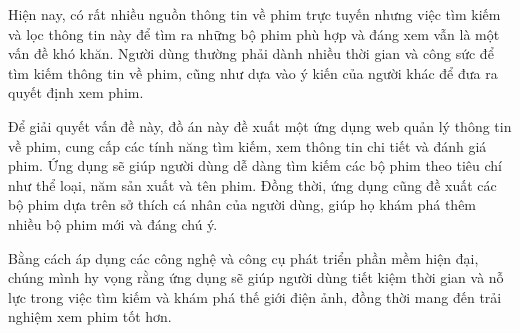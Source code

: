 \documentclass[12pt]{article}
\begin{document}
Hiện nay, có rất nhiều nguồn thông tin về phim trực tuyến nhưng việc tìm kiếm và lọc thông tin này để tìm ra những bộ phim phù hợp và đáng xem vẫn là một vấn đề khó khăn. Người dùng thường phải dành nhiều thời gian và công sức để tìm kiếm thông tin về phim, cũng như dựa vào ý kiến của người khác để đưa ra quyết định xem phim.

Để giải quyết vấn đề này, đồ án này đề xuất một ứng dụng web quản lý thông tin về phim, cung cấp các tính năng tìm kiếm, xem thông tin chi tiết và đánh giá phim. Ứng dụng sẽ giúp người dùng dễ dàng tìm kiếm các bộ phim theo tiêu chí như thể loại, năm sản xuất và tên phim. Đồng thời, ứng dụng cũng đề xuất các bộ phim dựa trên sở thích cá nhân của người dùng, giúp họ khám phá thêm nhiều bộ phim mới và đáng chú ý.

Bằng cách áp dụng các công nghệ và công cụ phát triển phần mềm hiện đại, chúng mình hy vọng rằng ứng dụng sẽ giúp người dùng tiết kiệm thời gian và nỗ lực trong việc tìm kiếm và khám phá thế giới điện ảnh, đồng thời mang đến trải nghiệm xem phim tốt hơn.
\end{document}
